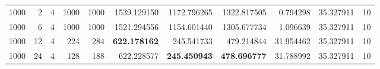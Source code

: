 \begin{table}
\begin{tabular}{rrrrrrrrrrr}
1000 & 2 & 4 & 1000 & 1000 & 1539.129150 & 1172.796265 & 1322.817505 & 0.794298 & 35.327911 & 10 \\
1000 & 6 & 4 & 1000 & 1000 & 1521.294556 & 1154.601440 & 1305.677734 & 1.096639 & 35.327911 & 10 \\
1000 & 12 & 4 & 224 & 284 & \textbf{622.178162} & 245.541733 & 479.214844 & 31.954462 & 35.327911 & 10 \\
1000 & 24 & 4 & 128 & 188 & 622.228577 & \textbf{245.450943} & \textbf{478.696777} & 31.788992 & 35.327911 & 10 \\
\bottomrule
\end{tabular}
\end{table}

